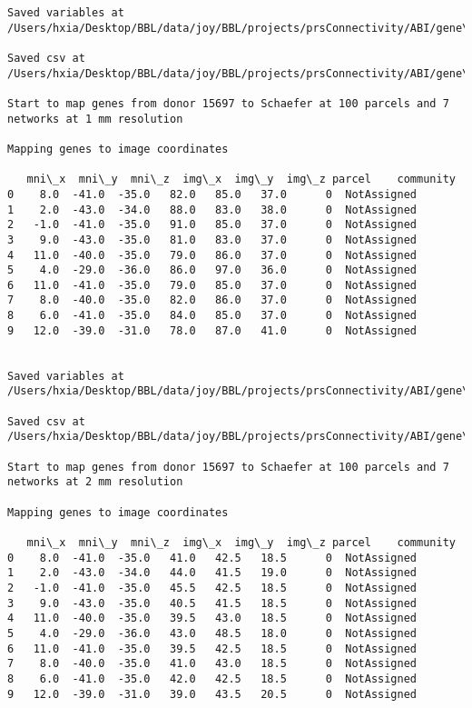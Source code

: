 \documentclass[11pt]{article}
\begin{document}
\begin{Verbatim}[commandchars=\\\{\}]
Saved variables at /Users/hxia/Desktop/BBL/data/joy/BBL/projects/prsConnectivity/ABI/gene\_mapping/15496donor\_800Parcels\_17Network\_2mm.pkl

Saved csv at /Users/hxia/Desktop/BBL/data/joy/BBL/projects/prsConnectivity/ABI/gene\_mapping/15496donor\_800Parcels\_17Network\_2mm.csv

Start to map genes from donor 15697 to Schaefer at 100 parcels and 7 networks at 1 mm resolution

Mapping genes to image coordinates

   mni\_x  mni\_y  mni\_z  img\_x  img\_y  img\_z parcel    community
0    8.0  -41.0  -35.0   82.0   85.0   37.0      0  NotAssigned
1    2.0  -43.0  -34.0   88.0   83.0   38.0      0  NotAssigned
2   -1.0  -41.0  -35.0   91.0   85.0   37.0      0  NotAssigned
3    9.0  -43.0  -35.0   81.0   83.0   37.0      0  NotAssigned
4   11.0  -40.0  -35.0   79.0   86.0   37.0      0  NotAssigned
5    4.0  -29.0  -36.0   86.0   97.0   36.0      0  NotAssigned
6   11.0  -41.0  -35.0   79.0   85.0   37.0      0  NotAssigned
7    8.0  -40.0  -35.0   82.0   86.0   37.0      0  NotAssigned
8    6.0  -41.0  -35.0   84.0   85.0   37.0      0  NotAssigned
9   12.0  -39.0  -31.0   78.0   87.0   41.0      0  NotAssigned


Saved variables at /Users/hxia/Desktop/BBL/data/joy/BBL/projects/prsConnectivity/ABI/gene\_mapping/15697donor\_100Parcels\_7Network\_1mm.pkl

Saved csv at /Users/hxia/Desktop/BBL/data/joy/BBL/projects/prsConnectivity/ABI/gene\_mapping/15697donor\_100Parcels\_7Network\_1mm.csv

Start to map genes from donor 15697 to Schaefer at 100 parcels and 7 networks at 2 mm resolution

Mapping genes to image coordinates

   mni\_x  mni\_y  mni\_z  img\_x  img\_y  img\_z parcel    community
0    8.0  -41.0  -35.0   41.0   42.5   18.5      0  NotAssigned
1    2.0  -43.0  -34.0   44.0   41.5   19.0      0  NotAssigned
2   -1.0  -41.0  -35.0   45.5   42.5   18.5      0  NotAssigned
3    9.0  -43.0  -35.0   40.5   41.5   18.5      0  NotAssigned
4   11.0  -40.0  -35.0   39.5   43.0   18.5      0  NotAssigned
5    4.0  -29.0  -36.0   43.0   48.5   18.0      0  NotAssigned
6   11.0  -41.0  -35.0   39.5   42.5   18.5      0  NotAssigned
7    8.0  -40.0  -35.0   41.0   43.0   18.5      0  NotAssigned
8    6.0  -41.0  -35.0   42.0   42.5   18.5      0  NotAssigned
9   12.0  -39.0  -31.0   39.0   43.5   20.5      0  NotAssigned



\end{Verbatim}
\end{document}
